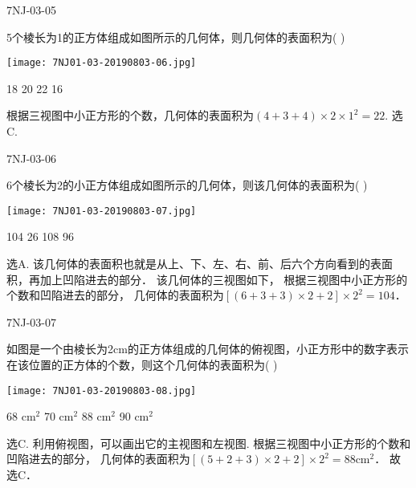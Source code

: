 \begin{defproblem}{7NJ-03-05}%
\begin{onlyproblem}%
5个棱长为1的正方体组成如图所示的几何体，则几何体的表面积为(    ) 
\begin{center}
\texttt{[image: 7NJ01-03-20190803-06.jpg]}
\end{center}

\xx
{18}
{20}
{22}
{16}

\end{onlyproblem}%
\begin{onlysolution}%
\begin{solution}%
根据三视图中小正方形的个数，几何体的表面积为$(4+3+4) \times 2 \times 1^{2}=22$.
选C.
\end{solution}%
\end{onlysolution}%
\end{defproblem}




\begin{defproblem}{7NJ-03-06}%
\begin{onlyproblem}%
6个棱长为2的小正方体组成如图所示的几何体，则该几何体的表面积为(    ) 
\begin{center}
\texttt{[image: 7NJ01-03-20190803-07.jpg]}
\end{center}

\xx
{104}
{26}
{108}
{96}

\end{onlyproblem}%
\begin{onlysolution}%
\begin{solution}%
选A. 
该几何体的表面积也就是从上、下、左、右、前、后六个方向看到的表面积，再加上凹陷进去的部分． 该几何体的三视图如下，   根据三视图中小正方形的个数和凹陷进去的部分， 几何体的表面积为$[(6+3+3) \times 2+2] \times 2^{2}=104$． 
\end{solution}%
\end{onlysolution}%
\end{defproblem}



\begin{defproblem}{7NJ-03-07}%
\begin{onlyproblem}%
如图是一个由棱长为2cm的正方体组成的几何体的俯视图，小正方形中的数字表示在该位置的正方体的个数，则这个几何体的表面积为(    ) 
\begin{center}
\texttt{[image: 7NJ01-03-20190803-08.jpg]}
\end{center}
\xx
{68 cm$^2$}
{70 cm$^2$}
{88 cm$^2$}
{90 cm$^2$}

\end{onlyproblem}%
\begin{onlysolution}%
\begin{solution}%
选C.
利用俯视图，可以画出它的主视图和左视图.   根据三视图中小正方形的个数和凹陷进去的部分， 几何体的表面积为$[(5+2+3) \times 2+2] \times 2^{2}=88 \mathrm{cm}^{2}$． 故选C． 
\end{solution}%
\end{onlysolution}%
\end{defproblem}








